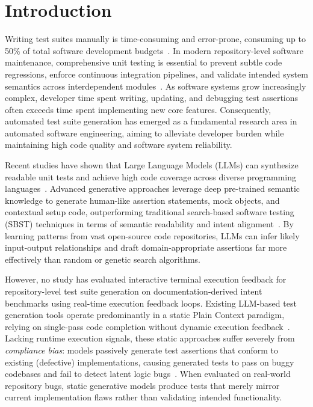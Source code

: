 \section{Introduction}
\label{sec:intro}

Writing test suites manually is time-consuming and error-prone, consuming up to 50\% of total software development budgets~\cite{myers2011art, evosuite, randoop, swebench}. In modern repository-level software maintenance, comprehensive unit testing is essential to prevent subtle code regressions, enforce continuous integration pipelines, and validate intended system semantics across interdependent modules~\cite{docprompting, repobench, cse}. As software systems grow increasingly complex, developer time spent writing, updating, and debugging test assertions often exceeds time spent implementing new core features. Consequently, automated test suite generation has emerged as a fundamental research area in automated software engineering, aiming to alleviate developer burden while maintaining high code quality and software system reliability.

Recent studies have shown that Large Language Models (LLMs) can synthesize readable unit tests and achieve high code coverage across diverse programming languages~\cite{bareiss2022code, lemieux2023codamosa, xie2023chatunitest}. Advanced generative approaches leverage deep pre-trained semantic knowledge to generate human-like assertion statements, mock objects, and contextual setup code, outperforming traditional search-based software testing (SBST) techniques in terms of semantic readability and intent alignment~\cite{siddiq2023exploratory, schafer2023empirical}. By learning patterns from vast open-source code repositories, LLMs can infer likely input-output relationships and draft domain-appropriate assertions far more effectively than random or genetic search algorithms.

However, no study has evaluated interactive terminal execution feedback for repository-level test suite generation on documentation-derived intent benchmarks using real-time execution feedback loops. Existing LLM-based test generation tools operate predominantly in a static Plain Context paradigm, relying on single-pass code completion without dynamic execution feedback~\cite{testexplora}. Lacking runtime execution signals, these static approaches suffer severely from \textit{compliance bias}: models passively generate test assertions that conform to existing (defective) implementations, causing generated tests to pass on buggy codebases and fail to detect latent logic bugs~\cite{testexplora, sweagent}. When evaluated on real-world repository bugs, static generative models produce tests that merely mirror current implementation flaws rather than validating intended functionality.

